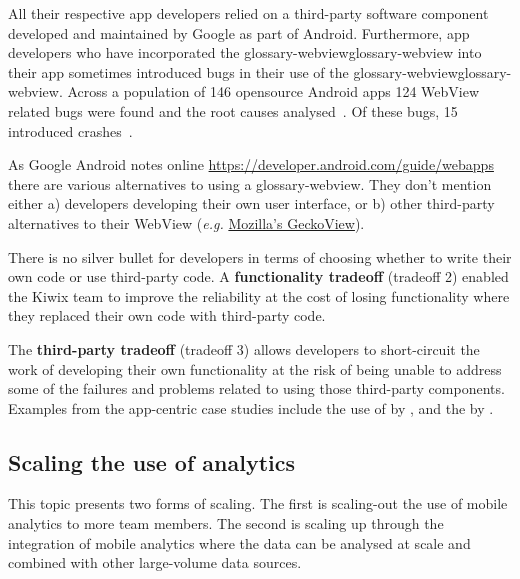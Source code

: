 All their respective app developers relied on a third-party software component developed and maintained by Google as part of Android. Furthermore, app developers who have incorporated the \Gls{glossary-webview}\Gls{glossary-webview} into their app sometimes introduced bugs in their use of the \Gls{glossary-webview}\Gls{glossary-webview}. Across a population of 146 opensource Android apps 124 WebView related bugs were found and the root causes analysed~. Of these bugs, 15 introduced crashes~.

As Google Android notes online \url{https://developer.android.com/guide/webapps} there are various alternatives to using a \Gls{glossary-webview}. They don't mention either a) developers developing their own user interface, or b) other third-party alternatives to their WebView (\emph{e.g.} \href{https://mozilla.github.io/geckoview/}{Mozilla's GeckoView}). 

There is no silver bullet for developers in terms of choosing whether to write their own code or use third-party code. A \textbf{functionality tradeoff} (tradeoff 2) enabled the Kiwix team to improve the reliability at the cost of losing functionality where they replaced their own code with third-party code. 

The \textbf{third-party tradeoff} (tradeoff 3) allows developers to short-circuit the work of developing their own functionality at the risk of being unable to address some of the failures and problems related to using those third-party components. Examples from the app-centric case studies include the use of  by , and the  by .

\subsection{Scaling the use of analytics}
This topic presents two forms of scaling. The first is scaling-out the use of mobile analytics to more team members. The second is scaling up through the integration of mobile analytics where the data can be analysed at scale and combined with other large-volume data sources.


